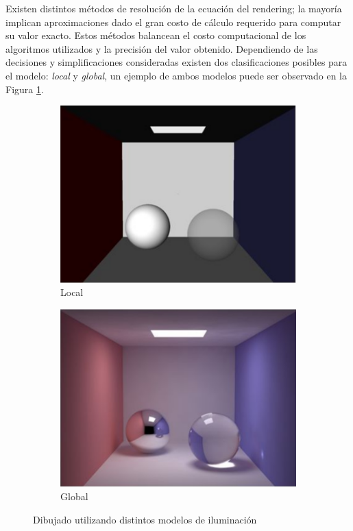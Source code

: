 Existen distintos métodos de resolución de la ecuación del rendering; la mayoría implican aproximaciones dado el gran costo de cálculo requerido para computar su valor exacto. Estos métodos balancean el costo computacional de los algoritmos utilizados y la precisión del valor obtenido. Dependiendo de las decisiones y simplificaciones consideradas existen dos clasificaciones posibles para el modelo: \textit{local} y \textit{global}, un ejemplo de ambos modelos puede ser observado en la Figura \ref{local-vs-global-img}.

\vspace{5mm}
\begin{figure}[h]
	\begin{subfigure}{0.5\textwidth}
		  	\centering
   		 	\includegraphics[width=1\linewidth]{assets/local}
   		 	\caption{Local}
   	\end{subfigure}
    \begin{subfigure}{0.5\textwidth}
    	\centering
    	\includegraphics[width=1\linewidth]{assets/global}
    	\caption{Global}
    \end{subfigure}
    \caption{Dibujado utilizando distintos modelos de iluminación}
    \label{local-vs-global-img}
\end{figure}

